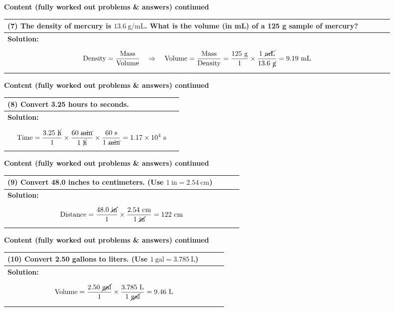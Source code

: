 \documentclass{article}
\begin{document}
\noindent
{\large \textbf{Content (fully worked out problems \& answers) continued}} \\[0.2em]
\begin{tabular}{|p{0.9\linewidth}|}
\hline
\vspace{0.2cm}

\textbf{(7)} The density of mercury is $13.6~\text{g/mL}$. What is the volume (in mL) of a 125 g sample of mercury? \\
\hline
\textbf{Solution:} \\
\[
\text{Density} = \frac{\text{Mass}}{\text{Volume}} \quad \Rightarrow \quad \text{Volume} = \frac{\text{Mass}}{\text{Density}}
= \frac{125~\text{g}}{1} \times \frac{1~\cancel{\text{mL}}}{13.6~\cancel{\text{g}}} 
= 9.19~\text{mL}
\] \\
\hline
\end{tabular}
\newpage
\noindent
{\large \textbf{Content (fully worked out problems \& answers) continued}} \\[0.2em]
\begin{tabular}{|p{0.9\linewidth}|}
\hline
\vspace{0.2cm}

\textbf{(8)} Convert 3.25 hours to seconds. \\
\hline
\textbf{Solution:} \\
\[
\text{Time} = \frac{3.25~\cancel{\text{h}}}{1} \times \frac{60~\cancel{\text{min}}}{1~\cancel{\text{h}}} \times \frac{60~\text{s}}{1~\cancel{\text{min}}}
= 1.17 \times 10^4~\text{s}
\] \\
\hline
\end{tabular}
\newpage

\noindent
{\large \textbf{Content (fully worked out problems \& answers) continued}} \\[0.2em]
\begin{tabular}{|p{0.9\linewidth}|}
\hline
\vspace{0.2cm}

\textbf{(9)} Convert 48.0 inches to centimeters. (Use $1~\text{in} = 2.54~\text{cm}$) \\
\hline
\textbf{Solution:} \\
\[
\text{Distance} = \frac{48.0~\cancel{\text{in}}}{1} \times \frac{2.54~\text{cm}}{1~\cancel{\text{in}}}
= 122~\text{cm}
\] \\
\hline
\end{tabular}
\newpage

\noindent
{\large \textbf{Content (fully worked out problems \& answers) continued}} \\[0.2em]
\begin{tabular}{|p{0.9\linewidth}|}
\hline
\vspace{0.2cm}

\textbf{(10)} Convert 2.50 gallons to liters. (Use $1~\text{gal} = 3.785~\text{L}$) \\
\hline
\textbf{Solution:} \\
\[
\text{Volume} = \frac{2.50~\cancel{\text{gal}}}{1} \times \frac{3.785~\text{L}}{1~\cancel{\text{gal}}}
= 9.46~\text{L}
\] \\
\hline
\end{tabular}
\newpage
\end{document}
